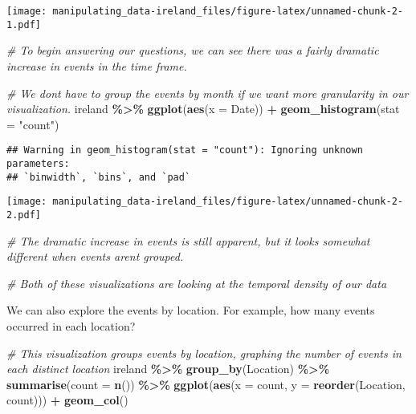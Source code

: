 \documentclass[
]{article}
\newenvironment{Shaded}{\begin{snugshade}}{\end{snugshade}}
\newcommand{\AttributeTok}[1]{\textcolor[rgb]{0.13,0.29,0.53}{#1}}
\newcommand{\CommentTok}[1]{\textcolor[rgb]{0.56,0.35,0.01}{\textit{#1}}}
\newcommand{\FunctionTok}[1]{\textcolor[rgb]{0.13,0.29,0.53}{\textbf{#1}}}
\newcommand{\NormalTok}[1]{#1}
\newcommand{\SpecialCharTok}[1]{\textcolor[rgb]{0.81,0.36,0.00}{\textbf{#1}}}
\newcommand{\StringTok}[1]{\textcolor[rgb]{0.31,0.60,0.02}{#1}}
\begin{document}
\texttt{[image: manipulating\_data-ireland\_files/figure-latex/unnamed-chunk-2-1.pdf]}

\begin{Shaded}
\begin{Highlighting}[]
\CommentTok{\# To begin answering our questions, we can see there was a fairly dramatic increase in events in the time frame.}

\CommentTok{\# We don\textquotesingle{}t have to group the events by month if we want more granularity in our visualization.}
\NormalTok{ireland }\SpecialCharTok{\%\textgreater{}\%}
  \FunctionTok{ggplot}\NormalTok{(}\FunctionTok{aes}\NormalTok{(}\AttributeTok{x =}\NormalTok{ Date)) }\SpecialCharTok{+} 
    \FunctionTok{geom\_histogram}\NormalTok{(}\AttributeTok{stat =} \StringTok{"count"}\NormalTok{)}
\end{Highlighting}
\end{Shaded}

\begin{verbatim}
## Warning in geom_histogram(stat = "count"): Ignoring unknown parameters:
## `binwidth`, `bins`, and `pad`
\end{verbatim}

\texttt{[image: manipulating\_data-ireland\_files/figure-latex/unnamed-chunk-2-2.pdf]}

\begin{Shaded}
\begin{Highlighting}[]
\CommentTok{\# The dramatic increase in events is still apparent, but it looks somewhat different when events aren\textquotesingle{}t grouped.}

\CommentTok{\# Both of these visualizations are looking at the temporal density of our data}
\end{Highlighting}
\end{Shaded}

We can also explore the events by location. For example, how many events
occurred in each location?

\begin{Shaded}
\begin{Highlighting}[]
\CommentTok{\# This visualization groups events by location, graphing the number of events in each distinct location}
\NormalTok{ireland }\SpecialCharTok{\%\textgreater{}\%} 
  \FunctionTok{group\_by}\NormalTok{(Location) }\SpecialCharTok{\%\textgreater{}\%} \FunctionTok{summarise}\NormalTok{(}\AttributeTok{count =} \FunctionTok{n}\NormalTok{()) }\SpecialCharTok{\%\textgreater{}\%}
  \FunctionTok{ggplot}\NormalTok{(}\FunctionTok{aes}\NormalTok{(}\AttributeTok{x =}\NormalTok{ count, }\AttributeTok{y =} \FunctionTok{reorder}\NormalTok{(Location, count))) }\SpecialCharTok{+} 
    \FunctionTok{geom\_col}\NormalTok{()}
\end{Highlighting}
\end{Shaded}
\end{document}
